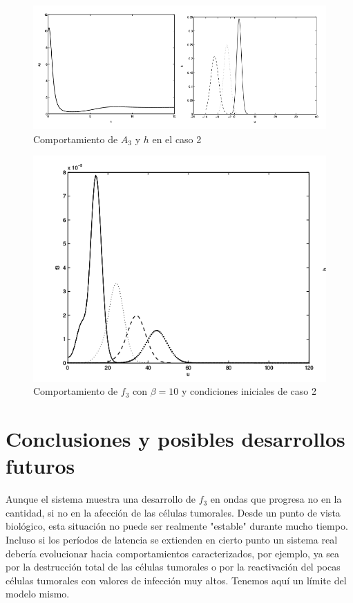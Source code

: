 \documentclass[1p]{elsarticle}
\begin{document}
\begin{figure}
	\centering
	\includegraphics[width=1\textwidth]{test2A3H.png}
	\caption{Comportamiento de $A_3$ y $h$ en el caso 2}
	\label{fig:ejemplo4}
\end{figure}
\begin{figure}
	\centering
	\includegraphics[width=1\textwidth]{test222.png}
	\caption{Comportamiento de $f_3$ con $\beta=10$ y condiciones iniciales de caso 2}
	\label{fig:ejemplo5}
\end{figure}
 
\section{Conclusiones y posibles desarrollos futuros}
Aunque el sistema muestra una desarrollo de $f_3$ en ondas que progresa no en la cantidad, si no en la afección de las células tumorales. Desde un punto de vista biológico, esta situación no puede ser realmente "estable" durante mucho tiempo. Incluso si los períodos de latencia se extienden en cierto punto un sistema real debería evolucionar hacia comportamientos caracterizados, por ejemplo, ya sea por la destrucción total de las células tumorales o por la reactivación del pocas células tumorales con valores de infección muy altos. Tenemos aquí un límite del modelo mismo.
\end{document}

